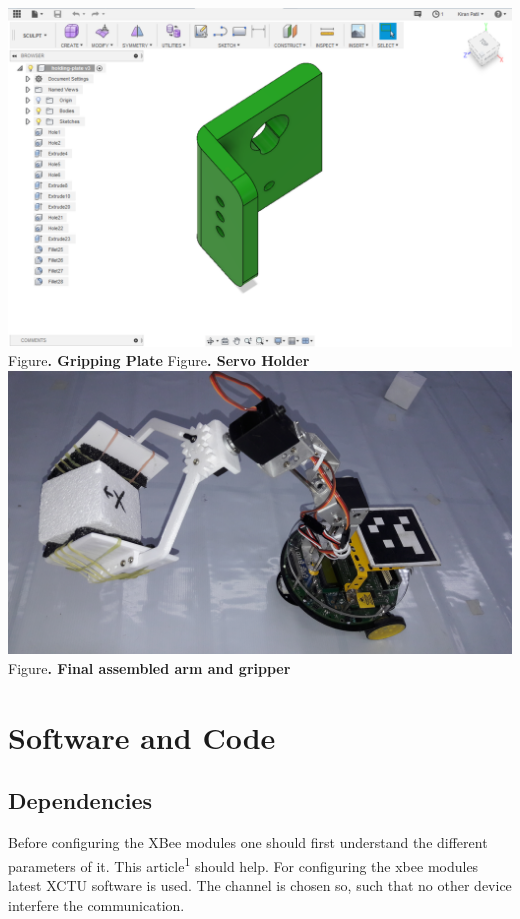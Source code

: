 \documentclass[a4paper,12pt,oneside]{book}
\begin{document}
\begin{center}
\includegraphics[scale=0.2]{HoldingPlate.png}\\
\small{Figure\textbf{. Gripping Plate} \hspace{5 em}Figure\textbf{. Servo Holder}}\\
\includegraphics[scale=0.045]{final.jpg}\\
\small{Figure\textbf{. Final assembled arm and gripper}}
\end{center}
\section{Software and Code}
\subsection*{Dependencies}
Before configuring the XBee modules one should first understand the different parameters of it. This article\textsuperscript{1} should help.  For configuring the xbee modules latest XCTU software is used. The channel is chosen so, such that no other device interfere the communication. 
\end{document}
